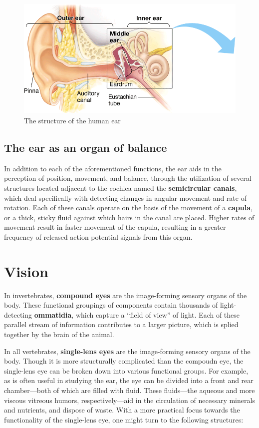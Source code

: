 \documentclass{article}
\begin{document}
\begin{figure}[h]
	\centering
	\includegraphics[width=0.8\linewidth]{ear_structure.png}
	\caption{The structure of the human ear}
\end{figure}

\subsection{The ear as an organ of balance}

In addition to each of the aforementioned functions, the ear aids in the
perception of position, movement, and balance, through the utilization of
several structures located adjacent to the cochlea named the
\textbf{semicircular canals}, which deal specifically with detecting
changes in angular movement and rate of rotation. Each of these canals
operate on the basis of the movement of a \textbf{capula}, or a thick,
sticky fluid against which hairs in the canal are placed. Higher rates of
movement result in faster movement of the capula, resulting in a greater
frequency of released action potential signals from this organ.

\section{Vision}

In invertebrates, \textbf{compound eyes} are the image-forming sensory organs
of the body. These functional groupings of components contain thousands of
light-detecting \textbf{ommatidia}, which capture a ``field of view'' of light.
Each of these parallel stream of information contributes to a larger picture,
which is splied together by the brain of the animal.

In all vertebrates, \textbf{single-lens eyes} are the image-forming sensory organs
of the body. Though it is more structurally complicated than the compoudn eye, the
single-lens eye can be broken down into various functional groups. For example,
as is often useful in studying the ear, the eye can be divided into a front and
rear chamber---both of which are filled with fluid. These fluids---the aqueous
and more viscous vitreous humors, respectively---aid in the circulation of
necessary minerals and nutrients, and dispose of waste. With a more practical
focus towards the functionality of the single-lens eye, one might turn to the
following structures:
\end{document}
